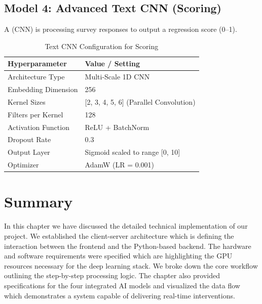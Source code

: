 \subsection{Model 4: Advanced Text CNN (Scoring)}
A (CNN) is processing survey responses to output a regression score (0--1).

\begin{table}[H]
\centering
\renewcommand{\arraystretch}{1.2}
\begin{tabular}{|l|l|}
\hline
\rowcolor{gray!15} \textbf{Hyperparameter} & \textbf{Value / Setting} \\ \hline
Architecture Type & Multi-Scale 1D CNN \\ \hline
Embedding Dimension & 256 \\ \hline
Kernel Sizes & [2, 3, 4, 5, 6] (Parallel Convolution) \\ \hline
Filters per Kernel & 128 \\ \hline
Activation Function & ReLU + BatchNorm \\ \hline
Dropout Rate & 0.3 \\ \hline
Output Layer & Sigmoid scaled to range [0, 10] \\ \hline
Optimizer & AdamW (LR = 0.001) \\ \hline
\end{tabular}
\caption{Text CNN Configuration for Scoring}
\label{tab:cnn_config}
\end{table}

\section{Summary}
In this chapter we have discussed the detailed technical implementation of our project. We established the client-server architecture which is defining the interaction between the frontend and the Python-based backend. The hardware and software requirements were specified which are highlighting the GPU resources necessary for the deep learning stack. We broke down the core workflow outlining the step-by-step processing logic. The chapter also provided specifications for the four integrated AI models and visualized the data flow which demonstrates a system capable of delivering real-time interventions.

